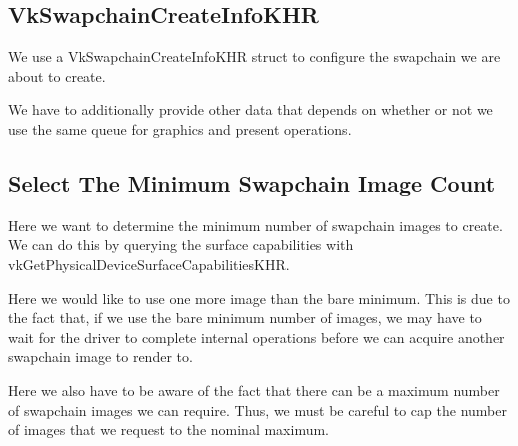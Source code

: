 \subsection{VkSwapchainCreateInfoKHR}

We use a VkSwapchainCreateInfoKHR struct to configure the swapchain we are
about to create.

\begin{minipage}{\linewidth}{\noindent}
    
\end{minipage}

We have to additionally provide other data that depends on whether or not we use
the same queue for graphics and present operations.

\begin{minipage}{\linewidth}{\noindent}
    
\end{minipage}

\subsection{Select The Minimum Swapchain Image Count}

Here we want to determine the minimum number of swapchain images to create.
We can do this by querying the surface capabilities with
vkGetPhysicalDeviceSurfaceCapabilitiesKHR.

\begin{minipage}{\linewidth}{\noindent}
    
\end{minipage}

Here we would like to use one more image than the bare minimum.
This is due to the fact that, if we use the bare minimum number of images,
we may have to wait for the driver to complete internal operations before
we can acquire another swapchain image to render to.

Here we also have to be aware of the fact that there can be a maximum number of
swapchain images we can require.
Thus, we must be careful to cap the number of images that
we request to the nominal maximum.

